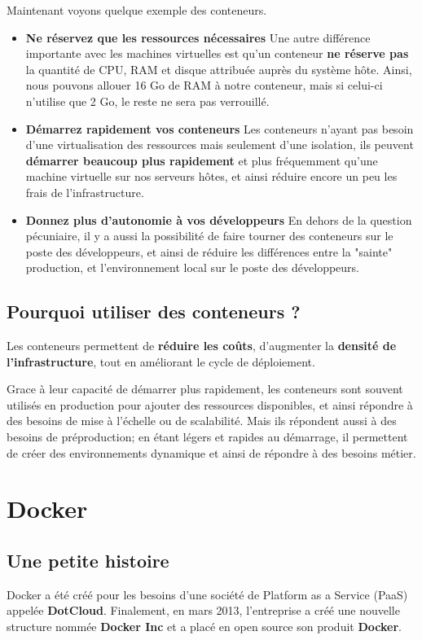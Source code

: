 \documentclass[12pt,a4paper]{article}
\begin{document}
Maintenant voyons quelque exemple des conteneurs.
\begin{itemize}
\item \textbf{Ne réservez que les ressources nécessaires}
Une autre différence importante avec les machines virtuelles est qu'un conteneur \textbf{ne réserve pas} la quantité de CPU, RAM et disque attribuée auprès du système hôte. Ainsi, nous pouvons allouer 16 Go de RAM à notre conteneur, mais si celui-ci n'utilise que 2 Go, le reste ne sera pas verrouillé.
\item \textbf{ Démarrez rapidement vos conteneurs}
Les conteneurs n'ayant pas besoin d'une virtualisation des ressources mais seulement d'une isolation, ils peuvent \textbf{démarrer beaucoup plus rapidement} et plus fréquemment qu'une machine virtuelle sur nos serveurs hôtes, et ainsi réduire encore un peu les frais de l'infrastructure.
\item \textbf{Donnez plus d'autonomie à vos développeurs}
En dehors de la question pécuniaire, il y a aussi la possibilité de faire tourner des conteneurs sur le poste des développeurs, et ainsi de réduire les différences entre la "sainte" production, et l'environnement local sur le poste des développeurs.
\end{itemize}

\subsection{Pourquoi utiliser des conteneurs ?}
Les conteneurs permettent de \textbf{réduire les coûts}, d'augmenter la \textbf{densité de l'infrastructure}, tout en améliorant le cycle de déploiement.

Grace à leur capacité de démarrer plus rapidement, les conteneurs sont souvent utilisés en 
production pour ajouter des ressources disponibles, et ainsi répondre à des besoins de mise
à l'échelle ou de scalabilité. Mais ils répondent aussi à des besoins de préproduction;
en étant légers et rapides au démarrage, il permettent de créer des environnements dynamique et ainsi de répondre à des besoins métier.

\section{Docker}
\subsection{Une petite histoire}
Docker a été créé pour les besoins d'une société de Platform as a Service (PaaS) appelée \textbf{DotCloud}. Finalement, en mars 2013, l'entreprise a créé une nouvelle structure nommée \textbf{Docker Inc} et a placé en open source son produit \textbf{Docker}.
\end{document}
